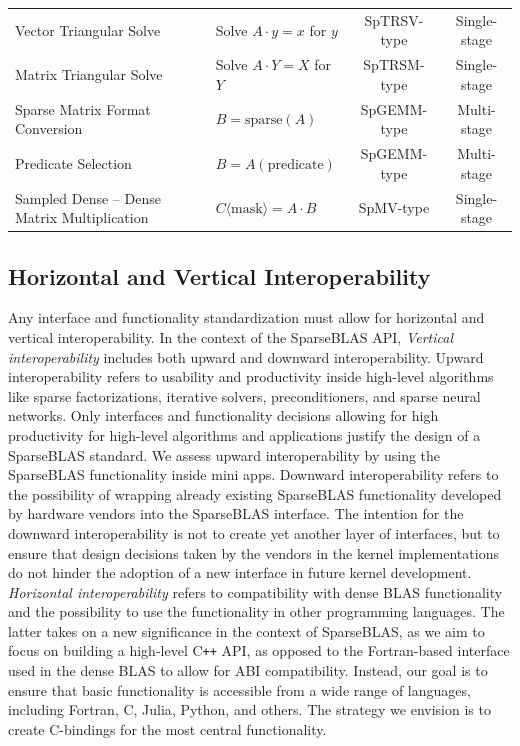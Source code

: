 \documentclass[manuscript,review]{acmart}
\newcommand{\cplusplus}{C\texttt{++}\xspace}
\begin{document}
\begin{table}[htbp]
\begin{tabularx}{\linewidth}{X >{\centering\arraybackslash}p{3.8cm} c c}
    Vector Triangular Solve & Solve $A \cdot y = x$ for $y$ & SpTRSV-type & Single-stage \\
    Matrix Triangular Solve & Solve $A \cdot Y = X$ for $Y$ & SpTRSM-type & Single-stage \\
    Sparse Matrix Format Conversion & $B = \text{sparse}(A)$ & SpGEMM-type & Multi-stage \\
    Predicate Selection & $B = A(\text{predicate})$ & SpGEMM-type & Multi-stage \\
    Sampled Dense -- Dense Matrix Multiplication & $C\langle\text{mask}\rangle = A \cdot B$ & SpMV-type & Single-stage \\
    \bottomrule
  \end{tabularx}
\end{table}



\subsection{Horizontal and Vertical Interoperability}

Any interface and functionality standardization must allow for horizontal and vertical interoperability. In the context of the SparseBLAS API,
\textit{Vertical interoperability} includes both upward and downward interoperability. Upward interoperability refers to usability and productivity inside high-level algorithms like sparse factorizations, iterative solvers, preconditioners, and sparse neural networks. Only interfaces and functionality decisions allowing for high productivity for high-level algorithms and applications justify the design of a SparseBLAS standard. We assess upward interoperability by using the SparseBLAS functionality inside mini apps. 
Downward interoperability refers to the possibility of wrapping already existing SparseBLAS functionality developed by hardware vendors into the SparseBLAS interface. The intention for the downward interoperability is not to create yet another layer of interfaces, but to ensure that design decisions taken by the vendors in the kernel implementations do not hinder the adoption of a new interface in future kernel 
development.
\textit{Horizontal interoperability} refers to compatibility with dense
BLAS functionality and the possibility to use the functionality in other
programming languages. The latter takes on a new significance in the
context of SparseBLAS, as we aim to focus on building a high-level
\cplusplus API, as opposed to the Fortran-based interface used in the
dense BLAS to allow for ABI compatibility. Instead, our goal is to ensure that basic functionality is accessible from a wide range of languages, including Fortran, C, Julia, Python, and others. The strategy we envision is to create C-bindings for the most central functionality.
\end{document}
